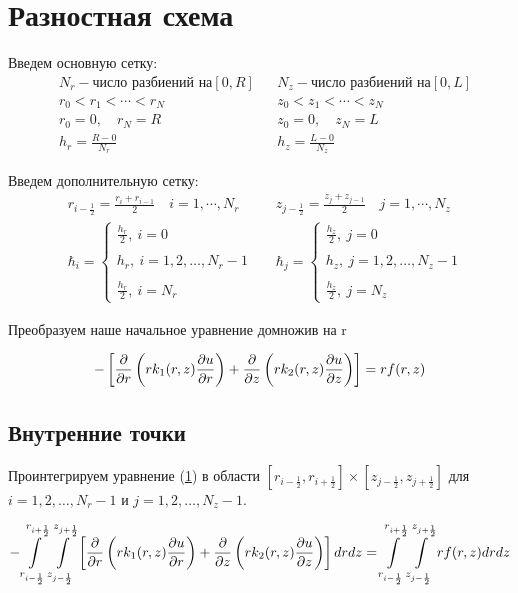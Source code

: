 \section{Разностная схема}
Введем основную сетку:
\begin{align*}
  &N_r - \text{число разбиений на} [0, R] & &N_z - \text{число разбиений на} [0, L] \\
  &r_0 < r_1 < \cdots < r_N & &z_0 < z_1 < \cdots < z_N \\
  &r_0 = 0,\quad r_N = R & &z_0 = 0,\quad z_N = L \\
  &h_r = \frac{R - 0}{N_r} & &h_z = \frac{L - 0}{N_z}
\end{align*}

Введем дополнительную сетку:
\begin{align*}
  &r_{i-\frac{1}{2}} = \frac{r_i + r_{i - 1}}{2}\quad i=1,\cdots, N_r & &z_{j-\frac{1}{2}} = \frac{z_j + z_{j - 1}}{2}\quad j=1,\cdots, N_z \\
  & \hbar_i = \begin{cases}
    \frac{h_r}{2},\ i = 0 \\ \\
    h_r,\ i = 1, 2, \dots, N_r-1 \\ \\
    \frac{h_r}{2},\ i = N_r
  \end{cases} &
  & \hbar_j = \begin{cases}
    \frac{h_z}{2},\ j = 0 \\ \\
    h_z,\ j = 1, 2, \dots, N_z-1 \\ \\
    \frac{h_z}{2},\ j = N_z
  \end{cases}
\end{align*}

Преобразуем наше начальное уравнение домножив на r

\[
  - \left [ \pdv{}{r} \left ( r k_1(r, z) \pdv{u}{r} \right ) 
  + \pdv{}{z} \left ( rk_2(r, z)\pdv{u}{z} \right ) \right ] = rf(r, z)
\]

\subsection{Внутренние точки}
Проинтегрируем уравнение (\hyperref[eq1]{1}) в области
$ [r_{i -\frac{1}{2}}, r_{i +\frac{1}{2}}] \times  [z_{j -\frac{1}{2}}, z_{j +\frac{1}{2}}] $
для $ i = 1, 2, \dots, N_r - 1 $ и $ j = 1, 2, \dots, N_z - 1$.

\[
  - \int\limits^{r_{i +\frac{1}{2}}}_{r_{i -\frac{1}{2}}} \int\limits^{z_{j +\frac{1}{2}}}_{z_{j -\frac{1}{2}}} \left [ \pdv{}{r} \left ( r k_1(r, z) \pdv{u}{r} \right ) 
  + \pdv{}{z} \left ( rk_2(r, z)\pdv{u}{z} \right ) \right ] dr dz = \int\limits^{r_{i +\frac{1}{2}}}_{r_{i -\frac{1}{2}}} \int\limits^{z_{j +\frac{1}{2}}}_{z_{j -\frac{1}{2}}} rf(r, z) dr dz
\]

